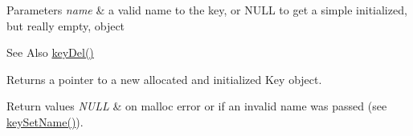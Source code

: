 \begin{DoxyParams}{Parameters}
{\em name} & a valid name to the key, or N\-U\-L\-L to get a simple initialized, but really empty, object \\
\hline
\end{DoxyParams}
\begin{DoxySeeAlso}{See Also}
\hyperlink{group__key_ga3df95bbc2494e3e6703ece5639be5bb1}{key\-Del()} 
\end{DoxySeeAlso}
\begin{DoxyReturn}{Returns}
a pointer to a new allocated and initialized Key object. 
\end{DoxyReturn}

\begin{DoxyRetVals}{Return values}
{\em N\-U\-L\-L} & on malloc error or if an invalid {\ttfamily name} was passed (see \hyperlink{group__keyname_ga7699091610e7f3f43d2949514a4b35d9}{key\-Set\-Name()}). \\
\hline
\end{DoxyRetVals}
